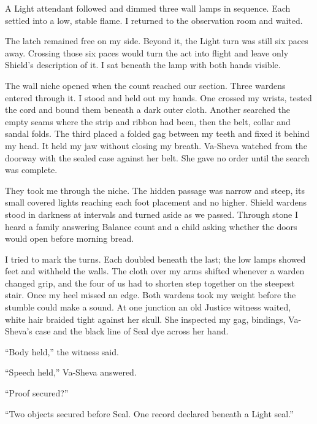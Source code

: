 A Light attendant followed and dimmed three wall lamps in sequence. Each settled into a low, stable flame. I returned to the observation room and waited.\par

The latch remained free on my side. Beyond it, the Light turn was still six paces away. Crossing those six paces would turn the act into flight and leave only Shield's description of it. I sat beneath the lamp with both hands visible.\par

The wall niche opened when the count reached our section. Three wardens entered through it. I stood and held out my hands. One crossed my wrists, tested the cord and bound them beneath a dark outer cloth. Another searched the empty seams where the strip and ribbon had been, then the belt, collar and sandal folds. The third placed a folded gag between my teeth and fixed it behind my head. It held my jaw without closing my breath. Va-Sheva watched from the doorway with the sealed case against her belt. She gave no order until the search was complete.\par

They took me through the niche. The hidden passage was narrow and steep, its small covered lights reaching each foot placement and no higher. Shield wardens stood in darkness at intervals and turned aside as we passed. Through stone I heard a family answering Balance count and a child asking whether the doors would open before morning bread.\par

I tried to mark the turns. Each doubled beneath the last; the low lamps showed feet and withheld the walls. The cloth over my arms shifted whenever a warden changed grip, and the four of us had to shorten step together on the steepest stair. Once my heel missed an edge. Both wardens took my weight before the stumble could make a sound. At one junction an old Justice witness waited, white hair braided tight against her skull. She inspected my gag, bindings, Va-Sheva's case and the black line of Seal dye across her hand.\par

``Body held,'' the witness said.\par

``Speech held,'' Va-Sheva answered.\par

``Proof secured?''\par

``Two objects secured before Seal. One record declared beneath a Light seal.''\par

